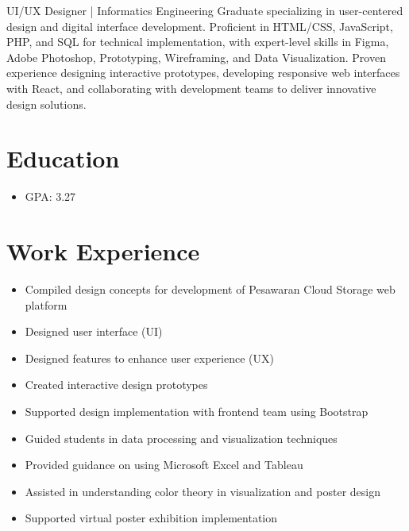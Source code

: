 UI/UX Designer | Informatics Engineering Graduate specializing in user-centered design and digital interface development. Proficient in HTML/CSS, JavaScript, PHP, and SQL for technical implementation, with expert-level skills in Figma, Adobe Photoshop, Prototyping, Wireframing, and Data Visualization. Proven experience designing interactive prototypes, developing responsive web interfaces with React, and collaborating with development teams to deliver innovative design solutions. 

\section*{Education}

\begin{itemize}
  \item GPA: 3.27
\end{itemize}

\section*{Work Experience}

\begin{itemize}
  \item Compiled design concepts for development of Pesawaran Cloud Storage web platform
  \item Designed user interface (UI)
  \item Designed features to enhance user experience (UX)
  \item Created interactive design prototypes
  \item Supported design implementation with frontend team using Bootstrap
\end{itemize}

\begin{itemize}
  \item Guided students in data processing and visualization techniques
  \item Provided guidance on using Microsoft Excel and Tableau
  \item Assisted in understanding color theory in visualization and poster design
  \item Supported virtual poster exhibition implementation
\end{itemize}

